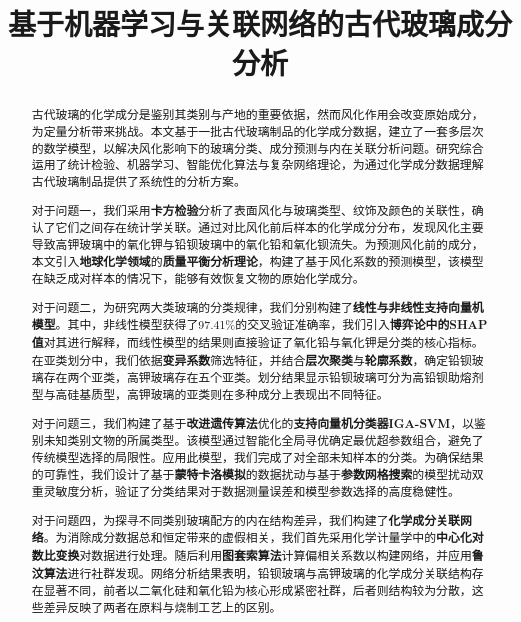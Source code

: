 \documentclass[withoutpreface,bwprint]{cumcmthesis} %
\title{基于机器学习与关联网络的古代玻璃成分分析}
\begin{document}
\maketitle

\begin{abstract}


古代玻璃的化学成分是鉴别其类别与产地的重要依据，然而风化作用会改变原始成分，为定量分析带来挑战。本文基于一批古代玻璃制品的化学成分数据，建立了一套多层次的数学模型，以解决风化影响下的玻璃分类、成分预测与内在关联分析问题。研究综合运用了统计检验、机器学习、智能优化算法与复杂网络理论，为通过化学成分数据理解古代玻璃制品提供了系统性的分析方案。


对于问题一，我们采用\textbf{卡方检验}分析了表面风化与玻璃类型、纹饰及颜色的关联性，确认了它们之间存在统计学关联。通过对比风化前后样本的化学成分分布，发现风化主要导致高钾玻璃中的氧化钾与铅钡玻璃中的氧化铅和氧化钡流失。为预测风化前的成分，本文引入\textbf{地球化学领域}的\textbf{质量平衡分析理论}，构建了基于风化系数的预测模型，该模型在缺乏成对样本的情况下，能够有效恢复文物的原始化学成分。


对于问题二，为研究两大类玻璃的分类规律，我们分别构建了\textbf{线性与非线性支持向量机模型}。其中，非线性模型获得了97.41\%的交叉验证准确率，我们引入\textbf{博弈论中的SHAP值}对其进行解释，而线性模型的结果则直接验证了氧化铅与氧化钾是分类的核心指标。在亚类划分中，我们依据\textbf{变异系数}筛选特征，并结合\textbf{层次聚类}与\textbf{轮廓系数}，确定铅钡玻璃存在两个亚类，高钾玻璃存在五个亚类。划分结果显示铅钡玻璃可分为高铅钡助熔剂型与高硅基质型，高钾玻璃的亚类则在多种成分上表现出不同特征。


对于问题三，我们构建了基于\textbf{改进遗传算法}优化的\textbf{支持向量机分类器IGA-SVM}，以鉴别未知类别文物的所属类型。该模型通过智能化全局寻优确定最优超参数组合，避免了传统模型选择的局限性。应用此模型，我们完成了对全部未知样本的分类。为确保结果的可靠性，我们设计了基于\textbf{蒙特卡洛模拟}的数据扰动与基于\textbf{参数网格搜索}的模型扰动双重灵敏度分析，验证了分类结果对于数据测量误差和模型参数选择的高度稳健性。


对于问题四，为探寻不同类别玻璃配方的内在结构差异，我们构建了\textbf{化学成分关联网络}。为消除成分数据总和恒定带来的虚假相关，我们首先采用化学计量学中的\textbf{中心化对数比变换}对数据进行处理。随后利用\textbf{图套索算法}计算偏相关系数以构建网络，并应用\textbf{鲁汶算法}进行社群发现。网络分析结果表明，铅钡玻璃与高钾玻璃的化学成分关联结构存在显著不同，前者以二氧化硅和氧化铅为核心形成紧密社群，后者则结构较为分散，这些差异反映了两者在原料与烧制工艺上的区别。



\end{abstract}










\newpage




\newpage
\end{document}
